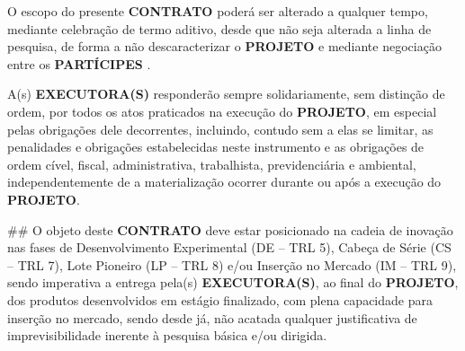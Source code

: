 \xx O escopo do presente \textbf{CONTRATO} poderá ser alterado a qualquer tempo, mediante celebração de termo aditivo, desde que não seja alterada a linha de pesquisa, de forma a não descaracterizar o \textbf{PROJETO} e mediante negociação entre os \textbf{PARTÍCIPES}    .

\xx A(s) \textbf{EXECUTORA(S)} responderão sempre solidariamente, sem distinção de ordem, por todos os atos praticados na execução do \textbf{PROJETO}, em especial pelas obrigações dele decorrentes, incluindo, contudo sem a elas se limitar, as penalidades e obrigações estabelecidas neste instrumento e as obrigações de ordem cível, fiscal, administrativa, trabalhista, previdenciária e ambiental, independentemente de a materialização ocorrer durante ou após a execução do \textbf{PROJETO}.

## O objeto deste \textbf{CONTRATO} deve estar posicionado na cadeia de inovação nas fases de Desenvolvimento Experimental (DE – TRL 5), Cabeça de Série (CS – TRL 7), Lote Pioneiro (LP – TRL 8) e/ou Inserção no Mercado (IM – TRL 9), sendo imperativa a entrega pela(s) \textbf{EXECUTORA(S)}, ao final do \textbf{PROJETO}, dos produtos desenvolvidos em estágio finalizado, com plena capacidade para inserção no mercado, sendo desde já, não acatada qualquer justificativa de imprevisibilidade inerente à pesquisa básica e/ou dirigida.
